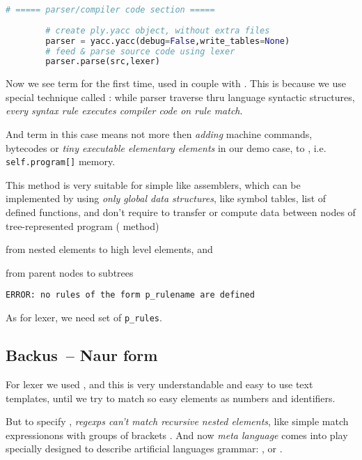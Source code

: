 \begin{lstlisting}[language=python]
		# ===== parser/compiler code section =====
		
		# create ply.yacc object, without extra files
		parser = yacc.yacc(debug=False,write_tables=None)
		# feed & parse source code using lexer
		parser.parse(src,lexer)				
\end{lstlisting}

Now we see term  for the first time, used in couple with
. This is because we use special technique called
: while parser traverse thru language
syntactic structures, \emph{every syntax rule executes compiler code on rule
match}.

And  term in this case means not more then \emph{adding} machine
commands, bytecodes or \emph{tiny executable elementary elements} in our demo
case, to , i.e. \verb|self.program[]| memory.

\bigskip
This method is very suitable for simple  like assemblers, which
can be implemented by using \emph{only global data structures}, like symbol
tables, list of defined functions, and don't require to transfer or compute data
between nodes of tree-represented program ( method)
\begin{description}[nosep]
  \item[synthesized attributes] from nested elements to high level elements, and
  \item[inherited attributes] from parent nodes to subtrees
\end{description}

\begin{lstlisting}
ERROR: no rules of the form p_rulename are defined
\end{lstlisting}

As for lexer, we need set of \verb|p_rules|.

\subsection{Backus\ -- Naur form}

For lexer we used , and this is very understandable
and easy to use text templates, until we try to match so easy elements as
numbers and identifiers.

\bigskip
But to specify , \emph{regexps can't match
recursive nested elements}, like simple match expressionons with groups of
brackets \cite{dragon}. And now \emph{meta language} comes into play specially designed to describe artificial
languages grammar: , or .

